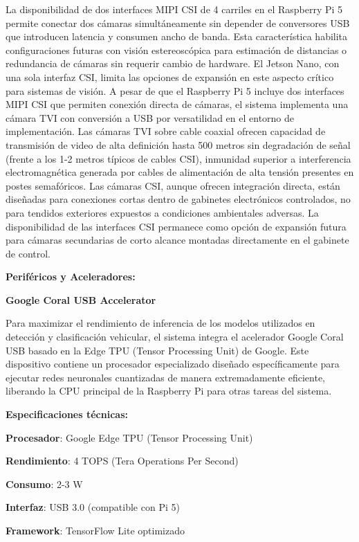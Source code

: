 \documentclass[12pt,a4paper,oneside]{report}
\begin{document}
La disponibilidad de dos interfaces MIPI CSI de 4 carriles en el Raspberry Pi 5 permite conectar dos cámaras simultáneamente sin depender de conversores USB que introducen latencia y consumen ancho de banda. Esta característica habilita configuraciones futuras con visión estereoscópica para estimación de distancias o redundancia de cámaras sin requerir cambio de hardware. El Jetson Nano, con una sola interfaz CSI, limita las opciones de expansión en este aspecto crítico para sistemas de visión. A pesar de que el Raspberry Pi 5 incluye dos interfaces MIPI CSI que permiten conexión directa de cámaras, el sistema implementa una cámara TVI con conversión a USB por versatilidad en el entorno de implementación. Las cámaras TVI sobre cable coaxial ofrecen capacidad de transmisión de video de alta definición hasta 500 metros sin degradación de señal (frente a los 1-2 metros típicos de cables CSI), inmunidad superior a interferencia electromagnética generada por cables de alimentación de alta tensión presentes en postes semafóricos. Las cámaras CSI, aunque ofrecen integración directa, están diseñadas para conexiones cortas dentro de gabinetes electrónicos controlados, no para tendidos exteriores expuestos a condiciones ambientales adversas. La disponibilidad de las interfaces CSI permanece como opción de expansión futura para cámaras secundarias de corto alcance montadas directamente en el gabinete de control.

\textbf{Periféricos y Aceleradores:}

\textbf{Google Coral USB Accelerator}

Para maximizar el rendimiento de inferencia de los modelos utilizados en detección y clasificación vehicular, el sistema integra el acelerador Google Coral USB basado en la Edge TPU (Tensor Processing Unit) de Google. Este dispositivo contiene un procesador especializado diseñado específicamente para ejecutar redes neuronales cuantizadas de manera extremadamente eficiente, liberando la CPU principal de la Raspberry Pi para otras tareas del sistema.

\textbf{Especificaciones técnicas:}

\textbf{Procesador}: Google Edge TPU (Tensor Processing Unit)

\textbf{Rendimiento}: 4 TOPS (Tera Operations Per Second)

\textbf{Consumo}: 2-3 W

\textbf{Interfaz}: USB 3.0 (compatible con Pi 5)

\textbf{Framework}: TensorFlow Lite optimizado
\end{document}
